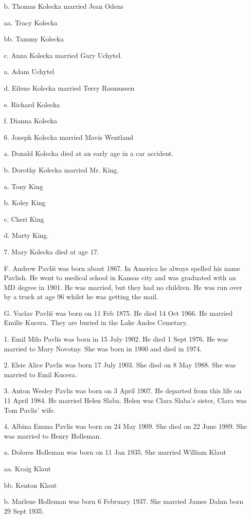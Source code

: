 \documentclass[a4paper]{article}
\begin{document}
b. Thomas Kolecka married Jean Odens

aa. Tracy Kolecka

bb. Tammy Kolecka

c. Anna Kolecka married Gary Uchytel.

a. Adam Uchytel

d. Eilene Kolecka married Terry Rasmussen

e. Richard Kolecka

f. Dianna Kolecka

6. Joseph Kolecka married Mavis Wentland

a. Donald Kolecka died  at an early age in a car accident.

b. Dorothy Kolecka married Mr. King.

a. Tony King

b. Koley King

c. Cheri King

d. Marty King.  

7. Mary Kolecka died at age 17.

F. Andrew Pavli\v{s} was born about 1867. In America he always spelled his name Pavlish.  He went to medical school in Kansas city and was graduated with an MD degree in 1901.  He was married, but they had no children.  He was run over by a truck at age 96 whilst he was getting the mail.

G. Vaclav Pavli\v{s} was born on 11 Feb 1875.  He died 14 Oct 1966.  He married Emilie Kucera.  They are buried in the Lake Andes Cemetary.    

1. Emil Milo Pavlis was born in 15 July 1902.  He died  1 Sept 1976.  He was married to Mary Novotny. She was born in 1900 and died in 1974.

2. Elsie Alice Pavlis was born 17 July 1903.  She died on 8 May 1988.  She was married to Emil Kucera.

3. Anton Wesley Pavlis was born on 3 April 1907.  He departed from this life on 11 April 1984.  He married Helen Slaba. Helen was Clara Slaba's sister, Clara was Tom Pavlis' wife. 

4. Albina Emma Pavlis was born on 24 May 1909.  She died on 22 June 1989. She was married to Henry Holleman.

a. Dolores Holleman was born on 11 Jan 1935.  She married William Klaut

aa. Kraig Klaut

bb. Kenton Klaut

b. Marlene Holleman was born 6 February 1937.  She married James Dahm born 29 Sept 1935.
\end{document}
